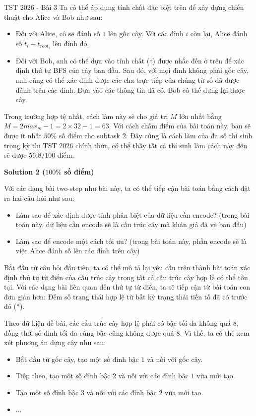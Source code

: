 \begin{tutorial}{TST 2026 - Bài 3}
Ta có thể áp dụng tính chất đặc biệt trên để xây dựng chiến thuật cho Alice và Bob như sau:
\begin{itemize}
   \item Đối với Alice, cô sẽ đánh số $1$ lên gốc cây. Với các đỉnh $i$ còn lại, Alice đánh số $t_i+t_{root_i}$ lên đỉnh đó.
   \item Đối với Bob, anh có thể dựa vào tính chất ($\dagger$) được nhắc đến ở trên để xác định thứ tự BFS của cây ban đầu. Sau đó, với mọi đỉnh không phải gốc cây, anh cũng có thể xác định được các cha trực tiếp của chúng từ số đã được đánh trên các đỉnh. Dựa vào các thông tin đã có, Bob có thể dựng lại được cây.
\end{itemize}

Trong trường hợp tệ nhất, cách làm này sẽ cho giá trị $M$ lớn nhất bằng $M=2max_N-1=2\times 32-1=63$. Với cách chấm điểm của bài toán này, bạn sẽ được ít nhất $50\%$ số điểm cho subtask $2$. Đây cũng là cách làm của đa số thí sinh trong kỳ thi TST 2026 chính thức, có thể thấy tất cả thí sinh làm cách này đều sẽ được $56.8/100$ điểm.

\textbf{Solution 2 ($100\%$ số điểm)}

Với các dạng bài two-step như bài này, ta có thể tiếp cận bài toán bằng cách đặt ra hai câu hỏi như sau:
\begin{itemize}
   \item Làm sao để xác định được tính phân biệt của dữ liệu cần encode? (trong bài toán này, dữ liệu cần encode sẽ là cấu trúc cây mà khán giả đã vẽ ban đầu)
   \item Làm sao để encode một cách tối ưu? (trong bài toán này, phần encode sẽ là việc Alice đánh số lên các đỉnh trên cây)
\end{itemize}

Bắt đầu từ câu hỏi đầu tiên, ta có thể mô tả lại yêu cầu trên thành bài toán xác định thứ tự từ điển của cấu trúc cây trong tất cả cấu trúc cây hợp lệ có thể tồn tại. Với các dạng bài liên quan đến thứ tự từ điển, ta sẽ tiếp cận từ bài toán con đơn giản hơn: Đếm số trạng thái hợp lệ từ bất kỳ trạng thái tiền tố đã có trước đó (*).

Theo dữ kiện đề bài, các cấu trúc cây hợp lệ phải có bậc tối đa không quá $8$, đồng thời số đỉnh tối đa cùng bậc cũng không được quá $8$. Vì thế, ta có thể xem xét phương án dựng cây như sau:
\begin{itemize}
   \item Bắt đầu từ gốc cây, tạo một số đỉnh bậc $1$ và nối với gốc cây.
   \item Tiếp theo, tạo một số đỉnh bậc $2$ và nối với các đỉnh bậc $1$ vừa mới tạo.
   \item Tạo một số đỉnh bậc $3$ và nối với các đỉnh bậc $2$ vừa mới tạo.
   \item ...
\end{itemize}


\end{tutorial}
